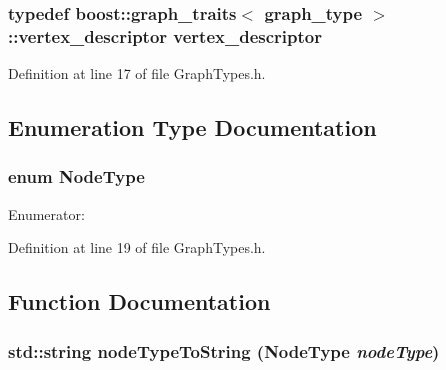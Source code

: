 \subsubsection{\setlength{\rightskip}{0pt plus 5cm}typedef boost::graph\_\-traits$<$ {\bf graph\_\-type} $>$::{\bf vertex\_\-descriptor} {\bf vertex\_\-descriptor}}\label{GraphTypes_8h_b2dd3626f9b1623eebd5e72d7064dc37}




Definition at line 17 of file GraphTypes.h.

\subsection{Enumeration Type Documentation}
\subsubsection{\setlength{\rightskip}{0pt plus 5cm}enum {\bf NodeType}}\label{GraphTypes_8h_cac9cbaeea226ed297804c012dc12b16}


\begin{Desc}
\item[Enumerator: ]\par
\begin{description}
\item[{\em 
GroupNodeType\label{GraphTypes_8h_cac9cbaeea226ed297804c012dc12b16f14b754d0197656fe38f927614758139}
}]\end{description}
\end{Desc}



Definition at line 19 of file GraphTypes.h.

\subsection{Function Documentation}
\subsubsection{\setlength{\rightskip}{0pt plus 5cm}std::string nodeTypeToString ({\bf NodeType} {\em nodeType})}\label{GraphTypes_8h_0d6de0bb6213b4ac98a1e84d679902b6}




